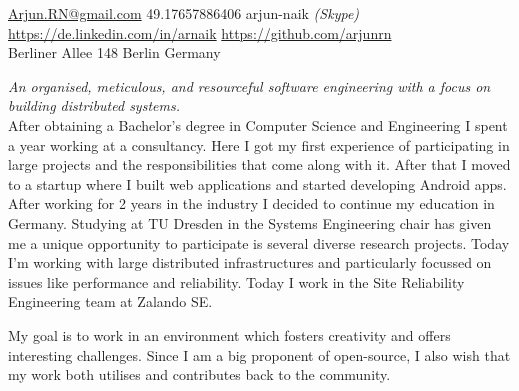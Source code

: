 \documentclass[10pt,a4paper]{article}
\begin{document}
\sloppy  %


\nobreakvspace{0.3em}  %

\noindent\href{mailto:Arjun.RN@gmail.com}{Arjun.RN\mbox{}@\mbox{}gmail.com}\sbull
\textsmaller{+}49.17657886406
\sbull arjun-naik \emph{(Skype)}
\\
\sbull
\href{https://de.linkedin.com/in/arnaik}{https://de.linkedin.com/in/arnaik}
\sbull
\href{https://github.com/arjunrn}{https://github.com/arjunrn}
\\
Berliner Allee 148\sbull
Berlin\sbull
Germany

\spacedhrule{0.9em}{-0.4em}  %


\vspace{-1.3em}  %
\begin{multicols}{2}  %
\noindent \emph{An organised, meticulous, and resourceful software engineering with a focus on building distributed systems.}
\\
After obtaining a Bachelor's degree in Computer Science and Engineering I spent a year working at a consultancy. Here I got my first experience of participating in large projects and the responsibilities that come along with it. After that I moved to a startup where I built web applications and started developing Android apps. After working for 2 years in the industry I decided to continue my education in Germany. Studying at TU Dresden in the Systems Engineering chair has given me a unique opportunity to participate is several diverse research projects. Today I'm working with large distributed infrastructures and particularly focussed on issues like performance and reliability. Today I work in the Site Reliability Engineering team at Zalando SE.

My goal is to work in an environment which fosters creativity and offers interesting challenges. Since I am a big proponent of open-source, I also wish that my work both utilises and contributes back to the community.

\end{multicols}
\end{document}
